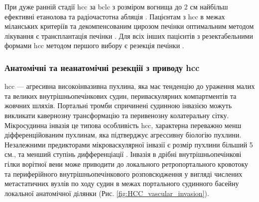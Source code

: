 При дуже ранній стадії \acrshort{hcc} за \acrshort{bclc} з розміром вогнища до 2 см найбільш ефективні етанолова та радіочастотна абляція  \cite{Cucchetti2013}. Пацієнтам з \acrshort{hcc} в межах міланських критеріїв та декомпенсованим цирозом печінки оптимальним методом лікування є трансплантація печінки \cite{Colombo2016}. Для всіх інших пацієнтів з резектабельними формами \acrshort{hcc} методом першого вибору є резекція печінки \cite{Heimbach2018, Kudo2011}. 

\subsubsection{Анатомічні та неанатомічні резекціії з приводу \acrshort{hcc}}

\acrshort{hcc} --- агресивна високоінвазивна пухлина, яка має тенденцію до ураження малих та великих внутрішньопечінкових судин, периваскулярних компартментів та жовчних шляхів. Портальні тромби спричинені судинною інвазією можуть викликати кавернозну трансформацію та перивенозну колатеральну сітку. Мікросудинна інвазія це типова особливість \acrshort{hcc}, характерна переважно менш діфференційованим пухлинам, яка підтверджує агрессивну біологію пухлини. Незалежними предикторами мікроваскулярної інвазії є розмір пухлини більший 5 см., та менший ступінь дифференціації \cite{Zimmermann2017}. Інвазія в дрібні внутрішньопечінкові гілки ворітної вени може приводити до локального ретропортального кровотоку та периферійного внутрішньопечінкового розповсюдження у вигляді числених метастатичних вузлів по ходу судин в межах портального судинного басейну локальної анатомічної ділянки (Рис. \ref{fig:HCC_vascular_invasion}). 



